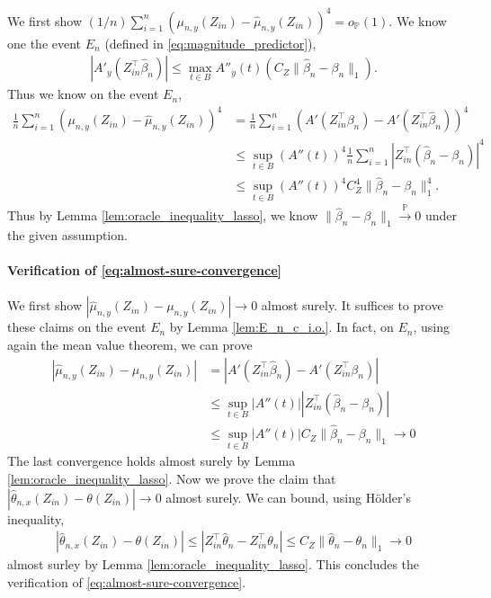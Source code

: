 \documentclass[12pt]{article}
\theoremstyle{definition}
\def\P{\mathbb{P}}
\def\P{\mathbb{P}}
\renewcommand{\P}{\mathbb{P}}							%
\newcommand{\convp}{\overset{\mathbb{P}}{\rightarrow}}             %
\newcommand{\srz}{Z}									%
\begin{document}
We first show $(1/n)\sum_{i=1}^n (\mu_{n,y}(\srz_{in})-\widehat{\mu}_{n,y}(\srz_{in}))^4=o_\P(1)$. We know one the event $E_n$ (defined in \eqref{eq:magnitude_predictor}),
\begin{align*}
  |A'_y(\srz_{in}^\top\widehat{\beta}_n)|\leq \max_{t\in B}A''_y(t)(C_Z\|\widehat{\beta}_n-\beta_n\|_1).
\end{align*}
Thus we know on the event $E_n$, 
\begin{align*}
  \frac{1}{n}\sum_{i=1}^n (\mu_{n,y}(\srz_{in})-\widehat{\mu}_{n,y}(\srz_{in}))^4
  &
  =\frac{1}{n}\sum_{i=1}^n (A'(\srz_{in}^\top\beta_n)-A'(\srz_{in}^\top\widehat{\beta}_n))^4\\
  &
  \leq \sup_{t\in B}(A''(t))^4\frac{1}{n}\sum_{i=1}^n |\srz_{in}^\top(\widehat{\beta}_n-\beta_n)|^4\tag{By mean value theorem}\\
  &
  \leq \sup_{t\in B}(A''(t))^4C_Z^4\|\widehat{\beta}_n-\beta_n\|_1^4.\tag{By H\"older's inequality}
\end{align*}
Thus by Lemma \ref{lem:oracle_inequality_lasso}, we know $\|\widehat{\beta}_n-\beta_n\|_1\convp 0$ under the given assumption.

\paragraph{Verification of \eqref{eq:almost-sure-convergence}}

We first show $|\widehat{\mu}_{n,y}(\srz_{in})-\mu_{n,y}(\srz_{in})|\rightarrow 0$ almost surely. It suffices to prove these claims on the event $E_n$ by Lemma \ref{lem:E_n_c_i.o.}. In fact, on $E_n$, using again the mean value theorem, we can prove
\begin{align*}
  |\widehat{\mu}_{n,y}(\srz_{in})-\mu_{n,y}(\srz_{in})|
  &
  =|A'(\srz_{in}^\top\widehat{\beta}_n)-A'(\srz_{in}^\top\beta_n)|\\
  &
  \leq \sup_{t\in B}|A''(t)||\srz_{in}^\top(\widehat{\beta}_n-\beta_n)|\\
  &
  \leq \sup_{t\in B}|A''(t)|C_Z\|\widehat{\beta}_n-\beta_n\|_1\rightarrow 0
\end{align*}
The last convergence holds almost surely by Lemma \ref{lem:oracle_inequality_lasso}. Now we prove the claim that $|\widehat{\theta}_{n,x}(\srz_{in})-\theta(\srz_{in})|\rightarrow0$ almost surely. We can bound, using H\"older's inequality,
\begin{align*}
  |\widehat{\theta}_{n,x}(\srz_{in})-\theta(\srz_{in})|\leq |\srz_{in}^\top\widehat{\theta}_n-\srz_{in}^\top\theta_n|\leq C_Z\|\widehat{\theta}_n-\theta_n\|_1\rightarrow 0
\end{align*}
almost surley by Lemma \ref{lem:oracle_inequality_lasso}. This concludes the verification of \eqref{eq:almost-sure-convergence}.
\end{document}
